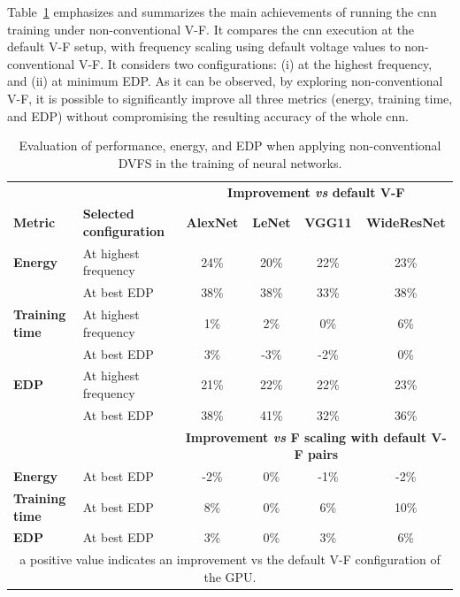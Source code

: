 Table~\ref{tab:trainingMetricsResults} emphasizes and summarizes the main achievements of running the \acrshort{cnn} training under non-conventional V-F. It compares the \acrshort{cnn} execution at the default V-F setup, with frequency scaling using default voltage values to non-conventional V-F. It considers two configurations: (i) at the highest frequency, and (ii) at minimum EDP. As it can be observed, by exploring non-conventional V-F, it is possible to significantly improve all three metrics (energy, training time, and EDP) without compromising the resulting accuracy of the whole \acrshort{cnn}. 

\begin{table}[htbp]
    \centering
    \label{tab:trainingMetricsResults}
    \begin{tabular}{llcccc}
        &  &  \multicolumn{4}{c}{\textbf{Improvement {\it vs} default V-F}} \\ 
        \cline{3-6} 
        \bf Metric &  \bf Selected configuration &    \textbf{AlexNet} &  \textbf{LeNet} &  \textbf{VGG11} &  \textbf{WideResNet} \\ \hline
        \textbf{Energy}        & At highest frequency & 24\% & 20\% & 22\% & 23\% \\
        \textbf{}              & At best EDP          & 38\% & 38\% & 33\% & 38\% \\\hline
        \textbf{Training time} & At highest frequency & 1\%  & 2\%  & 0\%  & 6\%  \\
        \textbf{}              & At best EDP          & 3\%  & -3\% & -2\% & 0\% \\\hline
        \textbf{EDP}           & At highest frequency & 21\% & 22\% & 22\% & 23\% \\
        \textbf{}              & At best EDP          & 38\% & 41\% & 32\% & 36\% \\ \hline
        
        &  &\multicolumn{4}{c}{\textbf{Improvement {\it vs} F scaling with default V-F pairs}} \\ \hline
        \textbf{Energy}        &At best EDP&  -2\% & 0\% & -1\% & -2\% \\\hline
        \textbf{Training time} &At best EDP&  8\%  & 0\%  & 6\%  & 10\%  \\\hline
        \textbf{EDP}           &At best EDP&  3\% & 0\% & 3\% & 6\% \\ \hline
        \multicolumn{6}{c}{a positive value indicates an improvement vs the default V-F configuration of the GPU.} \\
    \end{tabular}%
    \caption{Evaluation of performance, energy, and EDP when applying non-conventional DVFS in the training of neural networks.}
\end{table}

